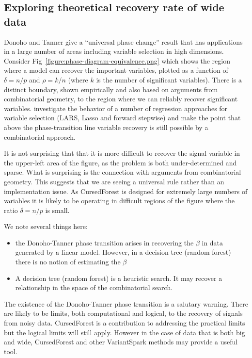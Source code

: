 \documentclass[a4paper]{amsart}
\begin{document}
\subsection{Exploring theoretical recovery rate of wide data}

 Donoho and Tanner \cite{Donoho.and.Tanner.2009} give a ``universal phase change'' result that has applications in a
 large number of areas including variable selection in high dimensions. Consider
 Fig~\ref{figure:phase-diagram-equivalence.png} which shows the region where a model can recover the important variables,
 plotted as a function of $\delta = n/p$ and $\rho =k/n$ (where $k$ is the number of significant variables). There is a
 distinct boundary, shown empirically and also based on arguments from combinatorial geometry, to the region where we can
 reliably recover significant variables.  \cite{Donoho.and.Stodden.2006} investigate the behavior of a number of
 regression approaches for variable selection (LARS, Lasso and forward stepwise) and make the point that above the
 phase-transition line variable recovery is still possible by a combinatorial approach.

 It is not surprising that that it is more difficult to recover the signal variable in the upper-left area of the figure,
 as the problem is both under-determined and sparse. What is surprising is the connection with arguments from
 combinatorial geometry. This suggests that we are seeing a universal rule rather than an implementation issue. As
 CursedForest is designed for extremely large numbers of variables it is likely to be operating in difficult regions of
 the figure where the ratio $\delta = n/p$ is small.


 We note several things here:
 \begin{itemize}
 \item the Donoho-Tanner phase transition arises in recovering the $\beta$ in data generated by a
   linear model. However, in a decision tree (random forest) there is no notion of estimating the $\beta$
 \item A decision tree (random forest) is a heuristic search. It may recover a relationship in the space of the
   combinatorial search.
 \end{itemize}

 The existence of the  Donoho-Tanner phase transition is a salutary warning. There are likely to be limits, both
 computational and logical, to the recovery of signals from noisy data. CursedForest  is a contribution to addressing the
 practical limits but the logical limits will still apply. However in the case of data that is both big and wide,
 CursedForest and other VariantSpark methods may provide a useful tool.
\end{document}
